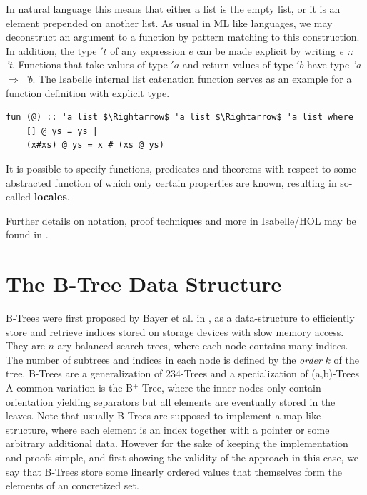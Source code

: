 In natural language this means that either a list is the empty list,
or it is an element prepended on another list.
As usual in ML like languages, we may deconstruct an argument to a function
by pattern matching to this construction.
In addition, the type $'t$ of any expression $e$ can be
made explicit by writing \textit{e :: 't}.
Functions that take values of type $'a$ and return values of type $'b$ 
have type \textit{'a $\Rightarrow$ 'b}.
The Isabelle internal list catenation function serves as
an example for a function definition with explicit type.

\begin{lstlisting}[mathescape=true, language=Isabelle,label=lst:append-def]
fun (@) :: 'a list $\Rightarrow$ 'a list $\Rightarrow$ 'a list where
    [] @ ys = ys |
    (x#xs) @ ys = x # (xs @ ys)
\end{lstlisting}

It is possible to specify functions, predicates
and theorems with respect to some abstracted function
of which only certain properties are known,
resulting in so-called \textbf{locales}.

Further details on notation, proof techniques and more in Isabelle/HOL
may be found in \parencite{DBLP:books/sp/NipkowPW02}.


\section{The B-Tree Data Structure}

B-Trees were first proposed by Bayer et al. in \parencite{DBLP:journals/acta/BayerM72},
as a data-structure to efficiently store and retrieve indices stored on storage devices
with slow memory access.
They are $n$-ary balanced search trees, where each
node contains many indices.
The number of subtrees and indices in each node is defined by the \textit{order} $k$ of the tree.
B-Trees are a generalization of 234-Trees and a specialization of (a,b)-Trees
A common variation is the B$^+$-Tree, where the inner nodes
only contain orientation yielding separators
but all elements are eventually stored in the leaves. 
\parencite{DBLP:journals/csur/Comer79}
Note that usually B-Trees are supposed to implement a map-like
structure, where each element is an index together with a pointer
or some arbitrary additional data.
However for the sake of keeping the implementation and proofs simple,
and first showing the validity of the approach in this case,
we say that B-Trees store some linearly ordered values
that themselves form the elements of an concretized set.

